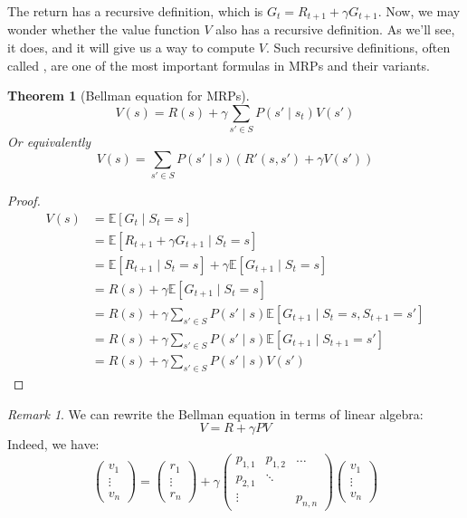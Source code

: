 \documentclass{article}
\newtheorem{theorem}{Theorem}[section]
\theoremstyle{definition}
\theoremstyle{remark}
\newtheorem*{remark}{Remark}
\theoremstyle{example}
\begin{document}
The return has a recursive definition, which is $G_t = R_{t+1} + \gamma G_{t+1}$. Now, we may wonder whether the value function $V$ also has a recursive definition. As we'll see, it does, and it will give us a way to compute $V$. Such recursive definitions, often called , are one of the most important formulas in MRPs and their variants.

\begin{theorem}[Bellman equation for MRPs]
				$$V(s) = R(s) + \gamma \sum_{s' \in S} P(s' \mid s_t) V(s')$$
		Or equivalently
				$$V(s) = \sum_{s' \in S} P(s' \mid s)(R'(s, s') + \gamma V(s'))$$
\end{theorem}

\begin{proof}
		\begin{align*}
				V(s) &= \mathbb{E}[G_t \mid S_t = s]\\
					   &= \mathbb{E}[R_{t+1} + \gamma G_{t+1} \mid S_t = s]\\
					   &= \mathbb{E}[R_{t+1} \mid S_t = s] + \gamma \mathbb{E}[G_{t+1} \mid S_t = s]\\
					   &= R(s) + \gamma \mathbb{E}[G_{t+1} \mid S_t = s]\\
					   &= R(s) + \gamma \sum_{s' \in S} P(s' \mid s) \mathbb{E}[G_{t+1} \mid S_t = s, S_{t+1} = s']\\
					   &= R(s) + \gamma \sum_{s' \in S} P(s' \mid s) \mathbb{E}[G_{t+1} \mid S_{t+1} = s']\\
					   &= R(s) + \gamma \sum_{s' \in S} P(s' \mid s) V(s')
		\end{align*}
\end{proof}

\begin{remark}
		We can rewrite the Bellman equation in terms of linear algebra:
				$$V = R + \gamma P V$$
		Indeed, we have:
				$$\begin{pmatrix} v_1 \\ \vdots \\ v_n \end{pmatrix} = \begin{pmatrix} r_1 \\ \vdots \\ r_n \end{pmatrix} + \gamma \begin{pmatrix} p_{1,1} & p_{1,2} & \dots \\ p_{2,1} & \ddots & \\ \vdots & & p_{n,n} \end{pmatrix} \begin{pmatrix} v_1 \\ \vdots \\ v_n \end{pmatrix}$$
\end{remark}
\end{document}
